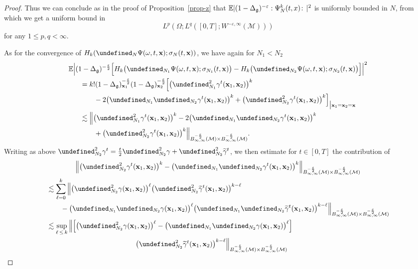 \documentclass[10pt,a4paper]{article}
\newcommand{\E}{\mathbb{E}}
\let\P= \undefined
\newcommand{\P}{\mathbf{P}}
\newcommand{\x}{\mathbf{x}}
\newcommand{\M}{\mathcal{M}}
\newcommand{\g}{\mathfrak{g}}
\newcommand{\Dlg}{\Delta_{\g}}
\newcommand{\eps}{\varepsilon}
\newcommand{\s}{\sigma}
\newcommand{\wt}{\widetilde}
\renewcommand{\o}{\omega}
\renewcommand{\O}{\Omega}
\newcommand{\les}{\lesssim}
\begin{document}
\begin{proof}
Thus we can conclude as in the proof of Proposition~\ref{prop-z} that $ \E|(1-\Dlg)^{-\eps}:\linebreak\Psi_N^k(t,x)\!:\,|^2$ is uniformly bounded in $N$, from which we get a uniform bound in 
\[
L^p\left(\O;L^q([0,T];W^{-\eps,\infty}(\M))\right)
\]
for any $1\leq p,q<\infty$.

As for the convergence of $H_k(\P_N\Psi(\o,t,\x);\s_N(t,\x))$, we have again for $N_1< N_2$
\begin{multline*}
\E\Big|(1-\Dlg)^{-\frac\eps2}\Big[H_k\big(\P_{N_1}\Psi(\o,t,\x);\s_{N_1}(t,\x)\big)-H_k\big(\P_{N_2}\Psi(\o,t,\x);\s_{N_2}(t,\x)\big)\Big]\Big|^2\\
\begin{aligned}
&=k!(1-\Dlg)_{\x_1}^{-\frac\eps2}(1-\Dlg)_{\x_2}^{-\frac\eps2}\Big[\big(\P_{N_1}^2\gamma^t(\x_1,\x_2)\big)^k\\
&\qquad-2\big(\P_{N_1}\P_{N_2}\gamma^t(\x_1,\x_2)\big)^k+\big(\P_{N_2}^2\gamma^t(\x_1,\x_2)\big)^k\Big]_{\big|\x_1=\x_2=\x}\\
&\les \Big\|\big(\P_{N_1}^2\gamma^t(\x_1,\x_2)\big)^k-2\big(\P_{N_1}\P_{N_2}\gamma^t(\x_1,\x_2)\big)^k\\
&\qquad+\big(\P_{N_2}^2\gamma^t(\x_1,\x_2)\big)^k\Big\|_{B^{-\frac{\eps}2}_{\infty,\infty}(\M)\times B^{-\frac{\eps}2}_{\infty,\infty}(\M)}.
\end{aligned}
\end{multline*}
Writing as above $\P_{N_2}^2\gamma^t = \frac{t}2\P_{N_2}^2\gamma + \P_{N_2}^2\wt\gamma^t$, we then estimate for $t\in [0,T]$ the contribution of
\begin{multline*}
\Big\|\big(\P_{N_2}^2\gamma^t(\x_1,\x_2)\big)^k-\big(\P_{N_1}\P_{N_2}\gamma^t(\x_1,\x_2)\big)^k\Big\|_{B^{-\frac{\eps}2}_{\infty,\infty}(\M)\times B^{-\frac{\eps}2}_{\infty,\infty}(\M)}\\
\begin{aligned}
&\les \sum_{\ell=0}^k \Big\|\big(\P_{N_2}^2\gamma(\x_1,\x_2)\big)^{\ell}\big(\P_{N_2}^2\wt\gamma^t(\x_1,\x_2)\big)^{k-\ell}\\
&\qquad-\big(\P_{N_1}\P_{N_2}\gamma(\x_1,\x_2)\big)^{\ell}\big(\P_{N_1}\P_{N_2}\wt\gamma^t(\x_1,\x_2)\big)^{k-\ell}\Big\|_{B^{-\frac{\eps}2}_{\infty,\infty}(\M)\times B^{-\frac{\eps}2}_{\infty,\infty}(\M)}\\
&\les \sup_{\ell\,\le\,k} \Big\|\Big[\big(\P_{N_2}^2\gamma(\x_1,\x_2)\big)^{\ell}-\big(\P_{N_1}\P_{N_2}\gamma(\x_1,\x_2)\big)^{\ell}\Big]\\
&\mkern230mu\big(\P_{N_2}^2\wt\gamma^t(\x_1,\x_2)\big)^{k-\ell}\Big\|_{B^{-\frac{\eps}2}_{\infty,\infty}(\M)\times B^{-\frac{\eps}2}_{\infty,\infty}(\M)}\\

\end{aligned}
\end{multline*}
\end{proof}
\end{document}
